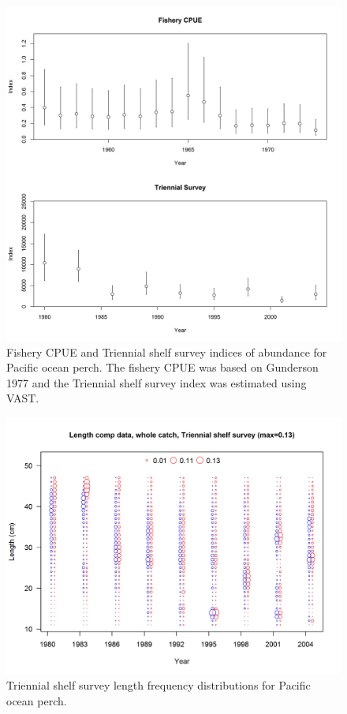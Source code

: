 \documentclass[12pt,]{article}
\begin{document}
\begin{figure}
\centering
\includegraphics{Figures/Index_Data_2.png}
\caption{Fishery CPUE and Triennial shelf survey indices of abundance
for Pacific ocean perch. The fishery CPUE was based on Gunderson 1977
and the Triennial shelf survey index was estimated using VAST.
\label{fig:Excluded_Indices}}
\end{figure}

\FloatBarrier

\begin{figure}
\centering
\includegraphics{r4ss/plots_mod1/comp_lendat_bubflt5mkt0.png}
\caption{Triennial shelf survey length frequency distributions for
Pacific ocean perch. \label{fig:Tri_Length}}
\end{figure}
\end{document}
